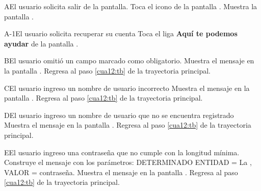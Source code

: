  
 \begin{UCtrayectoriaA}{A}{El usuario solicita salir de la pantalla.}
    \UCpaso[\UCactor] Toca el icono \btnRegresar de la pantalla .
	\UCpaso[\UCsist] Muestra la pantalla . 
 \end{UCtrayectoriaA}

 \begin{UCtrayectoriaA}{A-1}{El usuario solicita recuperar su cuenta}
	\UCpaso[\UCactor] Toca el liga \textbf{Aquí te podemos ayudar} de la pantalla .\label{cua12:pe} 
\end{UCtrayectoriaA}

 \begin{UCtrayectoriaA}{B}{El usuario omitió un campo marcado como obligatorio.}
 	\UCpaso[\UCsist] Muestra el mensaje  en la pantalla .
	\UCpaso[] Regresa al paso \ref{cua12:tb} de la trayectoria principal. 
	
\end{UCtrayectoriaA}


 \begin{UCtrayectoriaA}{C}{El usuario ingreso un nombre de usuario incorrecto}
	\UCpaso[\UCsist] Muestra el mensaje  en la pantalla .
	\UCpaso[] Regresa al paso \ref{cua12:tb} de la trayectoria principal. 
	
\end{UCtrayectoriaA}

 \begin{UCtrayectoriaA}{D}{El usuario ingreso un nombre de usuario que no se encuentra registrado}
	\UCpaso[\UCsist] Muestra el mensaje  en la pantalla .
	\UCpaso[] Regresa al paso \ref{cua12:tb} de la trayectoria principal. 
	
\end{UCtrayectoriaA}

 \begin{UCtrayectoriaA}{E}{El usuario ingreso una contraseña que no cumple con la longitud mínima.}
 	\UCpaso[\UCsist] Construye el mensaje  con los parámetros: DETERMINADO ENTIDAD = La , VALOR = contraseña.
	\UCpaso[\UCsist] Muestra el mensaje  en la pantalla .
	\UCpaso[] Regresa al paso \ref{cua12:tb} de la trayectoria principal. 
\end{UCtrayectoriaA}

